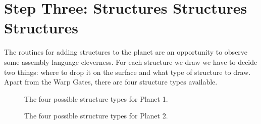 \section{Step Three: Structures Structures Structures}
The routines for adding structures to the planet are an opportunity to observe some assembly language cleverness.
For each structure we draw we have to decide two things: where to drop it on the surface and what type of structure
to draw. Apart from the Warp Gates, there are four structure types available. 

\begin{figure}[H]
  {
    \setlength{\tabcolsep}{3.0pt}
    \setlength\cmidrulewidth{\heavyrulewidth} %
    \begin{adjustbox}{width=15cm,center}
      \begin{subfigure}{0.3\textwidth}
        
      \end{subfigure}
      \begin{subfigure}{0.3\textwidth}
        
      \end{subfigure}
      \begin{subfigure}{0.3\textwidth}
        
      \end{subfigure}
      \begin{subfigure}{0.3\textwidth}
        
      \end{subfigure}
    \end{adjustbox}
  }\caption[]{The four possible structure types for Planet 1.}
\end{figure}

\begin{figure}[H]
  {
    \setlength{\tabcolsep}{3.0pt}
    \setlength\cmidrulewidth{\heavyrulewidth} %
    \begin{adjustbox}{width=15cm,center}
      \begin{subfigure}{0.3\textwidth}
        
      \end{subfigure}
      \begin{subfigure}{0.3\textwidth}
        
      \end{subfigure}
      \begin{subfigure}{0.3\textwidth}
        
      \end{subfigure}
      \begin{subfigure}{0.3\textwidth}
        
      \end{subfigure}
    \end{adjustbox}
  }\caption[]{The four possible structure types for Planet 2.}
\end{figure}

